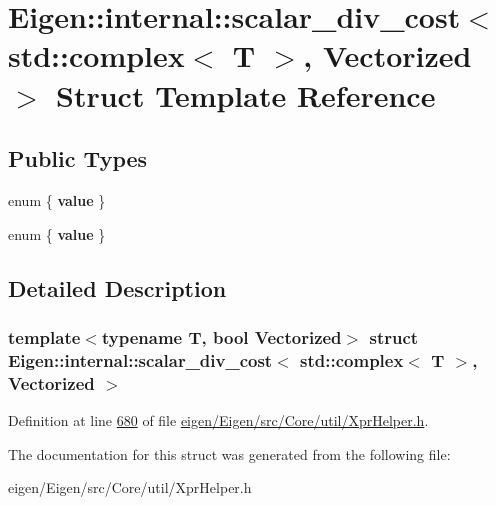 \hypertarget{struct_eigen_1_1internal_1_1scalar__div__cost_3_01std_1_1complex_3_01_t_01_4_00_01_vectorized_01_4}{}\section{Eigen\+:\+:internal\+:\+:scalar\+\_\+div\+\_\+cost$<$ std\+:\+:complex$<$ T $>$, Vectorized $>$ Struct Template Reference}
\label{struct_eigen_1_1internal_1_1scalar__div__cost_3_01std_1_1complex_3_01_t_01_4_00_01_vectorized_01_4}
\subsection*{Public Types}
\begin{DoxyCompactItemize}
\item 
\mbox{\label{struct_eigen_1_1internal_1_1scalar__div__cost_3_01std_1_1complex_3_01_t_01_4_00_01_vectorized_01_4_ab3109d948b965b23136a58180fcae03e}} 
enum \{ {\bfseries value}
 \}
\item 
\mbox{\label{struct_eigen_1_1internal_1_1scalar__div__cost_3_01std_1_1complex_3_01_t_01_4_00_01_vectorized_01_4_af9d9b5b7c36d94cdb69d8bd11c1b7617}} 
enum \{ {\bfseries value}
 \}
\end{DoxyCompactItemize}


\subsection{Detailed Description}
\subsubsection*{template$<$typename T, bool Vectorized$>$\newline
struct Eigen\+::internal\+::scalar\+\_\+div\+\_\+cost$<$ std\+::complex$<$ T $>$, Vectorized $>$}



Definition at line \hyperlink{eigen_2_eigen_2src_2_core_2util_2_xpr_helper_8h_source_l00680}{680} of file \hyperlink{eigen_2_eigen_2src_2_core_2util_2_xpr_helper_8h_source}{eigen/\+Eigen/src/\+Core/util/\+Xpr\+Helper.\+h}.



The documentation for this struct was generated from the following file\+:\begin{DoxyCompactItemize}
\item 
eigen/\+Eigen/src/\+Core/util/\+Xpr\+Helper.\+h\end{DoxyCompactItemize}
